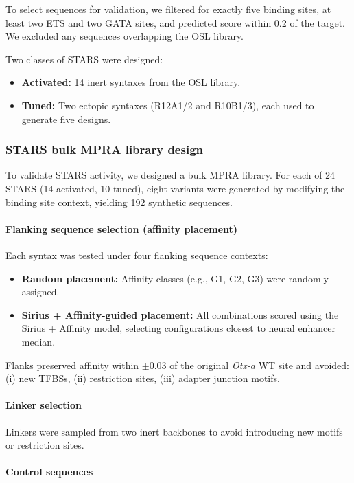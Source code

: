 To select sequences for validation, we filtered for exactly five binding sites, at least two ETS and two GATA sites, and predicted score within 0.2 of the target. We excluded any sequences overlapping the OSL library.

Two classes of STARS were designed:
\begin{itemize}
  \item \textbf{Activated:} 14 inert syntaxes from the OSL library.
  \item \textbf{Tuned:} Two ectopic syntaxes (R12A1/2 and R10B1/3), each used to generate five designs.
\end{itemize}

\subsubsection{STARS bulk MPRA library design}

To validate STARS activity, we designed a bulk MPRA library. For each of 24 STARS (14 activated, 10 tuned), eight variants were generated by modifying the binding site context, yielding 192 synthetic sequences.

\paragraph{Flanking sequence selection (affinity placement)}

Each syntax was tested under four flanking sequence contexts:
\begin{itemize}
  \item \textbf{Random placement:} Affinity classes (e.g., G1, G2, G3) were randomly assigned.
  \item \textbf{Sirius + Affinity-guided placement:} All combinations scored using the Sirius + Affinity model, selecting configurations closest to neural enhancer median.
\end{itemize}

Flanks preserved affinity within \(\pm0.03\) of the original \textit{Otx-a} WT site and avoided: (i) new TFBSs, (ii) restriction sites, (iii) adapter junction motifs.

\paragraph{Linker selection}

Linkers were sampled from two inert backbones to avoid introducing new motifs or restriction sites.

\paragraph{Control sequences}

